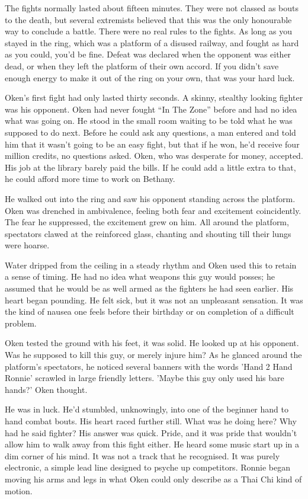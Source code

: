 The fights normally lasted about fifteen minutes. They were not classed as bouts to the death, but several extremists believed that this was the only honourable way to conclude a battle. There were no real rules to the fights. As long as you stayed in the ring, which was a platform of a disused railway, and fought as hard as you could, you'd be fine. Defeat was declared when the opponent was either dead, or when they left the platform of their own accord. If you didn't save enough energy to make it out of the ring on your own, that was your hard luck. 

Oken's first fight had only lasted thirty seconds. A skinny, stealthy looking fighter was his opponent. Oken had never fought ``In The Zone'' before and had no idea what was going on. He stood in the small room waiting to be told what he was supposed to do next. Before he could ask any questions, a man entered and told him that it wasn't going to be an easy fight, but that if he won, he'd receive four million credits, no questions asked. Oken, who was desperate for money, accepted. His job at the library barely paid the bills. If he could add a little extra to that, he could afford more time to work on Bethany.

He walked out into the ring and saw his opponent standing across the platform. Oken was drenched in ambivalence, feeling both fear and excitement coincidently. The fear he suppressed, the excitement grew on him. All around the platform, spectators clawed at the reinforced glass, chanting and shouting till their lungs were hoarse. 

Water dripped from the ceiling in a steady rhythm and Oken used this to retain a sense of timing. He had no idea what weapons this guy would posses; he assumed that he would be as well armed as the fighters he had seen earlier. His heart began pounding. He felt sick, but it was not an unpleasant sensation. It was the kind of nausea one feels before their birthday or on completion of a difficult problem.

 Oken tested the ground with his feet, it was solid. He looked up at his opponent. Was he supposed to kill this guy, or merely injure him? As he glanced around the platform's spectators, he noticed several banners with the words 'Hand 2 Hand Ronnie' scrawled in large friendly letters. 'Maybe this guy only used his bare hands?' Oken thought. 

He was in luck. He'd stumbled, unknowingly, into one of the beginner hand to hand combat bouts. His heart raced further still. What was he doing here? Why had he said fighter? His answer was quick. Pride, and it was pride that wouldn't allow him to walk away from this fight either. He heard some music start up in a dim corner of his mind. It was not a track that he recognised. It was purely electronic, a simple lead line designed to psyche up competitors. Ronnie began moving his arms and legs in what Oken could only describe as a Thai Chi kind of motion. 

